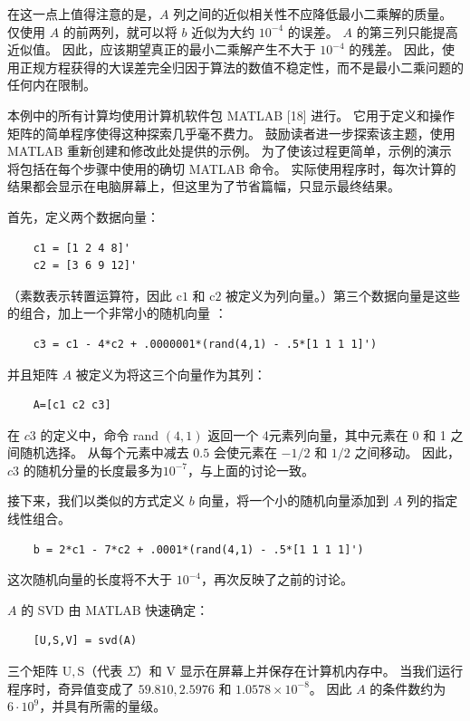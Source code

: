 \documentclass[11pt,a4paper,twoside]{article}
\begin{document}
\begin{CJK}{UTF8}{gbsn}
在这一点上值得注意的是，$A$ 列之间的近似相关性不应降低最小二乘解的质量。 仅使用 $A$ 的前两列，就可以将 $b$ 近似为大约 $10^{-4}$ 的误差。 $A$ 的第三列只能提高近似值。 因此，应该期望真正的最小二乘解产生不大于 $10^{-4}$ 的残差。 因此，使用正规方程获得的大误差完全归因于算法的数值不稳定性，而不是最小二乘问题的任何内在限制。

本例中的所有计算均使用计算机软件包 MATLAB [18] 进行。 它用于定义和操作矩阵的简单程序使得这种探索几乎毫不费力。 鼓励读者进一步探索该主题，使用 MATLAB 重新创建和修改此处提供的示例。 为了使该过程更简单，示例的演示将包括在每个步骤中使用的确切 MATLAB 命令。 实际使用程序时，每次计算的结果都会显示在电脑屏幕上，但这里为了节省篇幅，只显示最终结果。

首先，定义两个数据向量：
\begin{lstlisting}
    c1 = [1 2 4 8]'
    c2 = [3 6 9 12]'
\end{lstlisting}
（素数表示转置运算符，因此 $\mathrm{c} 1$ 和 $\mathrm{c} 2$ 被定义为列向量。）第三个数据向量是这些的组合，加上一个非常小的随机向量 ：
\begin{lstlisting}
    c3 = c1 - 4*c2 + .0000001*(rand(4,1) - .5*[1 1 1 1]')
\end{lstlisting}
并且矩阵 $A$ 被定义为将这三个向量作为其列：
\begin{lstlisting}
    A=[c1 c2 c3]
\end{lstlisting}

在 $c 3$ 的定义中，命令 rand $(4,1)$ 返回一个 4元素列向量，其中元素在 0 和 1 之间随机选择。 从每个元素中减去 $0.5$ 会使元素在 $-1 / 2$ 和 $1 / 2$ 之间移动。 因此，$c 3$ 的随机分量的长度最多为$10^{-7}$，与上面的讨论一致。

接下来，我们以类似的方式定义 $b$ 向量，将一个小的随机向量添加到 $A$ 列的指定线性组合。
\begin{lstlisting}
    b = 2*c1 - 7*c2 + .0001*(rand(4,1) - .5*[1 1 1 1]')
\end{lstlisting}

这次随机向量的长度将不大于 $10^{-4}$，再次反映了之前的讨论。

$A$ 的 SVD 由 MATLAB 快速确定：
\begin{lstlisting}
	[U,S,V] = svd(A)
\end{lstlisting}

三个矩阵 $\mathrm{U},\mathrm{S}$（代表 $\Sigma$）和 $\mathrm{V}$ 显示在屏幕上并保存在计算机内存中。 当我们运行程序时，奇异值变成了 $59.810,2.5976$ 和 $1.0578 \times 10^{-8}$。 因此 $A$ 的条件数约为 $6 \cdot 10^{9}$，并具有所需的量级。


\end{CJK}
\end{document}
